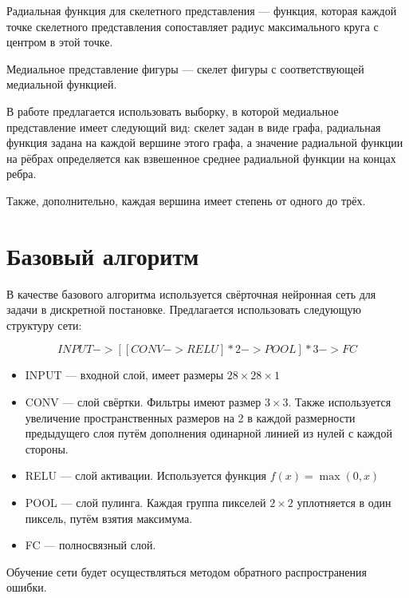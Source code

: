 \documentclass[12pt,twoside]{article}
\begin{document}
	\begin{Def}
		Радиальная функция для скелетного представления --- функция, которая каждой точке скелетного представления сопоставляет радиус максимального круга с центром в этой точке.
	\end{Def}
	
	\begin{Def}
		Медиальное представление фигуры --- скелет фигуры с соответствующей медиальной функцией.
	\end{Def}
	
	В работе предлагается использовать выборку, в которой медиальное представление имеет следующий вид: скелет задан в виде графа, радиальная функция задана на каждой вершине этого графа, а значение радиальной функции на рёбрах определяется как взвешенное среднее радиальной функции на концах ребра. 
	
	Также, дополнительно, каждая вершина имеет степень от одного до трёх.
	
	\section{Базовый алгоритм}
	
	В качестве базового алгоритма используется свёрточная нейронная сеть для задачи в дискретной постановке. Предлагается использовать следующую структуру сети:
	
	$$INPUT -> [[CONV -> RELU]*2 -> POOL]*3 -> FC$$
	
	\begin{itemize}
		\item INPUT --- входной слой, имеет размеры $28\times28\times1$
		\item CONV --- слой свёртки. Фильтры имеют размер $3\times3$. Также используется увеличение пространственных размеров на 2 в каждой размерности предыдущего слоя путём дополнения одинарной линией из нулей с каждой стороны.
		\item RELU --- слой активации. Используется функция $f(x)=\max(0,x)$
		\item POOL --- слой пулинга. Каждая группа пикселей $2\times2$ уплотняется в один пиксель, путём взятия максимума.
		\item FC --- полносвязный слой. 
	\end{itemize}
	
	Обучение сети будет осуществляться методом обратного распространения ошибки.
	
	\nocite{*}
	
	
	
\end{document}
